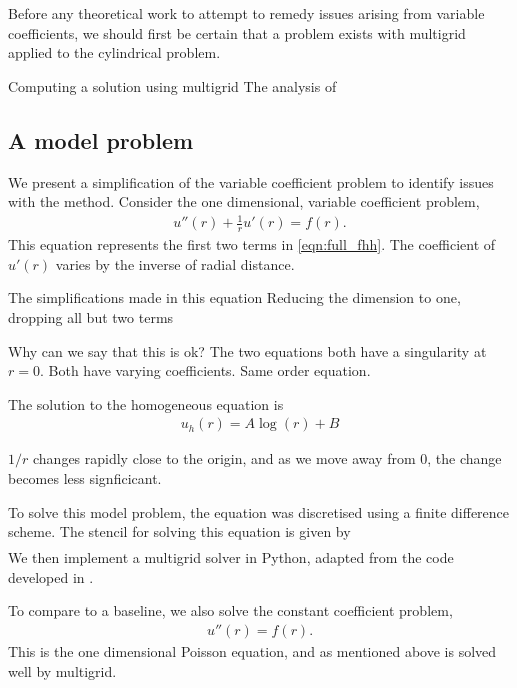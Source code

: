 Before any theoretical work to attempt to remedy issues arising from variable coefficients, we should first be certain that a problem exists with multigrid applied to the cylindrical problem.

Computing a solution using multigrid
The analysis of 



\subsection{A model problem}


We present a simplification of the variable coefficient problem to identify issues with the method.
Consider the one dimensional, variable coefficient problem,
\begin{align}
	u''(r) + \frac{1}{r}u'(r) = f(r). \label{eqn:model}
\end{align}
This equation represents the first two terms in \eqref{eqn:full_fhh}.
The coefficient of $u'(r)$ varies by the inverse of radial distance.

The simplifications made in this equation
Reducing the dimension to one, dropping all but two terms

Why can we say that this is ok?
The two equations both have a singularity at $r=0$.
Both have varying coefficients.
Same order equation.


The solution to the homogeneous equation is 
\begin{align}
	u_h(r) = A \log(r) + B
\end{align}

$1/r$ changes rapidly close to the origin, and as we move away from 0, the change becomes less signficicant.


To solve this model problem, the equation was discretised using a finite difference scheme.
The stencil for solving this equation is given by
\begin{align}
\end{align}
We then implement a multigrid solver in Python, adapted from the code developed in \cite{weir}.

To compare to a baseline, we also solve the constant coefficient problem,
\begin{align}
	u''(r) = f(r).
\end{align}
This is the one dimensional Poisson equation, and as mentioned above is solved well by multigrid.

